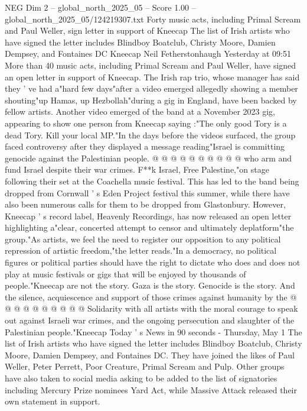 \begin{textsample}{NEG Dim 2 – global\_north\_2025\_05 – Score 1.00 – global\_north\_2025\_05/124219307.txt}  \label{ex:f2_neg_042}
Forty music acts, including Primal Scream and Paul Weller, sign letter in support of Kneecap The list of Irish artists who have signed the letter includes Blindboy Boatclub, Christy Moore, Damien Dempsey, and Fontaines DC Kneecap Neil Fetherstonhaugh Yesterday at 09:51 More than 40 music acts, including Primal Scream and Paul Weller, have signed an open letter in support of Kneecap.
The Irish rap trio, whose manager has said they ' ve had a"hard few days"after a video emerged allegedly showing a member shouting"up Hamas, up Hezbollah"during a gig in England, have been backed by fellow artists.
Another video emerged of the band at a November 2023 gig, appearing to show one person from Kneecap saying :"The only good Tory is a dead Tory.
Kill your local MP."In the days before the videos surfaced, the group faced controversy after they displayed a message reading"Israel is committing genocide against the Palestinian people. @ @ @ @ @ @ @ @ @ @ who arm and fund Israel despite their war crimes.
F**k Israel, Free Palestine,"on stage following their set at the Coachella music festival.
This has led to the band being dropped from Cornwall ' s Eden Project festival this summer, while there have also been numerous calls for them to be dropped from Glastonbury.
However, Kneecap ' s record label, Heavenly Recordings, has now released an open letter highlighting a"clear, concerted attempt to censor and ultimately deplatform"the group."As artists, we feel the need to register our opposition to any political repression of artistic freedom,"the letter reads."In a democracy, no political figures or political parties should have the right to dictate who does and does not play at music festivals or gigs that will be enjoyed by thousands of people."Kneecap are not the story.
Gaza is the story.
Genocide is the story.
And the silence, acquiescence and support of those crimes against humanity by the @ @ @ @ @ @ @ @ @ @ Solidarity with all artists with the moral courage to speak out against Israeli war crimes, and the ongoing persecution and slaughter of the Palestinian people."Kneecap Today ' s News in 90 seconds - Thursday, May 1 The list of Irish artists who have signed the letter includes Blindboy Boatclub, Christy Moore, Damien Dempsey, and Fontaines DC.
They have joined the likes of Paul Weller, Peter Perrett, Poor Creature, Primal Scream and Pulp.
Other groups have also taken to social media asking to be added to the list of signatories including Mercury Prize nominees Yard Act, while Massive Attack released their own statement in support.

\end{textsample}
